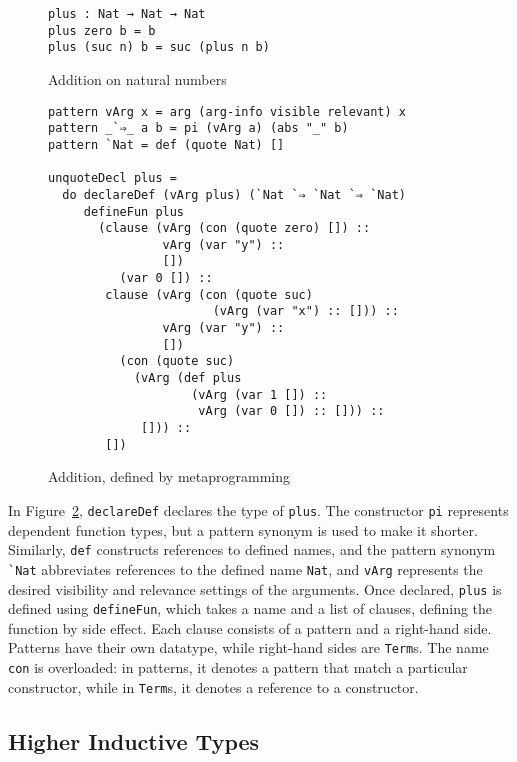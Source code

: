 \documentclass[sigplan,10pt]{acmart}
\begin{document}
\begin{figure}[h]
\begin{Verbatim}
plus : Nat → Nat → Nat
plus zero b = b
plus (suc n) b = suc (plus n b)
\end{Verbatim}
  \caption{Addition on natural numbers}
  \label{fig:plus}
\end{figure}



\begin{figure}
\begingroup
\fontsize{9pt}{10pt}\selectfont
\begin{Verbatim}
pattern vArg x = arg (arg-info visible relevant) x
pattern _`⇒_ a b = pi (vArg a) (abs "_" b)
pattern `Nat = def (quote Nat) []

unquoteDecl plus =
  do declareDef (vArg plus) (`Nat `⇒ `Nat `⇒ `Nat)
     defineFun plus
       (clause (vArg (con (quote zero) []) ::
                vArg (var "y") ::
                [])
          (var 0 []) ::
        clause (vArg (con (quote suc)
                       (vArg (var "x") :: [])) ::
                vArg (var "y") ::
                [])
          (con (quote suc)
            (vArg (def plus
                    (vArg (var 1 []) ::
                     vArg (var 0 []) :: [])) ::
             [])) ::
        [])
\end{Verbatim}
\endgroup
\caption{Addition, defined by metaprogramming}
\label{fig:plusmeta}
\end{figure}

In Figure~\ref{fig:plusmeta}, {\tt declareDef} declares the type of {\tt plus}.
The constructor {\tt pi} represents dependent function types, but a pattern synonym is used to make it shorter.
Similarly, \texttt{def} constructs references to defined names, and the pattern synonym \Verb|`Nat| abbreviates references to the defined name \texttt{Nat}, and {\tt vArg} represents the desired visibility and relevance settings of the arguments.
Once declared, \texttt{plus} is defined using {\tt defineFun}, which takes a name and a list of clauses, defining the function by side effect.
Each clause consists of a pattern and a right-hand side.
Patterns have their own datatype, while right-hand sides are \texttt{Term}s.
The name \texttt{con} is overloaded: in patterns, it denotes a pattern that match a particular constructor, while in \texttt{Term}s, it denotes a reference to a constructor.


\subsection{Higher Inductive Types}
\label{sec:sec2.2}
\end{document}
